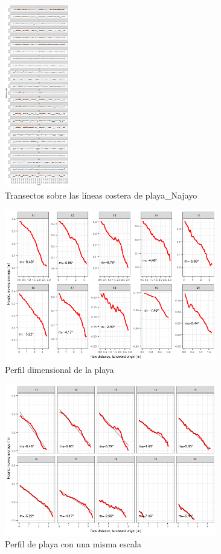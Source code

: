 \documentclass[11pt,]{article}
\begin{document}
\begin{figure}
\centering
\includegraphics[height=3.12500in]{cambio_playa_Najayo.png}
\caption{Transectos sobre las líneas costera de
playa\_Najayo\label{cambio}}
\end{figure}

\begin{figure}
\centering
\includegraphics[height=2.60417in]{dimension_real.png}
\caption{Perfil dimensional de la playa\label{dimensional}}
\end{figure}

\begin{figure}
\centering
\includegraphics[height=2.60417in]{escala_diferente_consistente.png}
\caption{Perfil de playa con una misma escala\label{escala}}
\end{figure}
\end{document}
